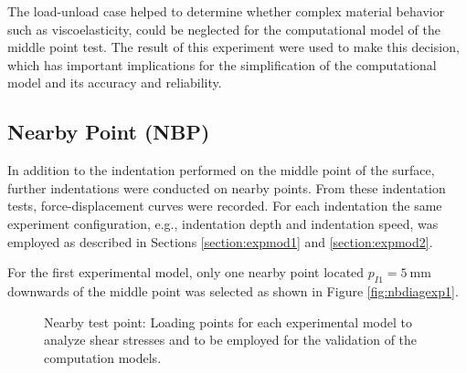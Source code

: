 The load-unload case helped to determine whether complex material behavior such as 
viscoelasticity, could be neglected for the computational model of the middle point test.
The result of this experiment were used to make this decision, which has important 
implications for the simplification of the computational model and its accuracy and reliability.

\subsection*{Nearby Point (NBP)}
\label{subsection:nearbypoint}
In addition to the indentation performed on the middle point of the surface, further 
indentations were conducted on nearby points. From these indentation tests, force-displacement 
curves were recorded. For each indentation the same experiment configuration, 
e.g., indentation depth and indentation 
speed, was employed as described in Sections \ref{section:expmod1} and \ref{section:expmod2}.

For the first experimental model, only one nearby point located $p_{I1} = \SI{5}{\milli \m}$ 
downwards of the middle point was selected as shown in Figure \ref{fig:nbdiagexp1}.

\begin{figure}%
    \centering
   \qquad
   \caption[Nearby point test positions]{Nearby test point: Loading points for each experimental model to analyze shear stresses and to be employed for the validation of the computation models.}%
   \label{fig:nbexp}%
\end{figure}


